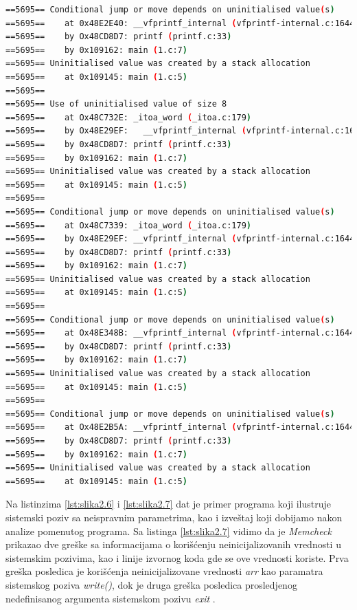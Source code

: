 \documentclass[12pt,oneside]{memoir}
\theoremstyle{plain}
\theoremstyle{definition}
\begin{document}

\begin{lstlisting}[style=terminal,caption={Primer ispisa greške korišćenja neinicializovane ili neadresirane vrednosti u sistemskom pozivu}, label={lst:slika2.7},language={bash}] 
==5695== Conditional jump or move depends on uninitialised value(s)
==5695==	at 0x48E2E40: __vfprintf_internal (vfprintf-internal.c:1644)
==5695==	by Ox48CD8D7: printf (printf.c:33)
==5695==	by 0x109162: main (1.c:7)
==5695== Uninitialised value was created by a stack allocation
==5695==	at 0x109145: main (1.c:5)
==5695==
==5695== Use of uninitialised value of size 8 
==5695==	at Ox48C732E: _itoa_word (_itoa.c:179)
==5695==	by Ox48E29EF:	__vfprintf_internal (vfprintf-internal.c:1644)
==5695==	by 0x48CD8D7: printf (printf.c:33)
==5695==	by 0x109162: main (1.c:7)
==5695== Uninitialised value was created by a stack allocation
==5695==	at 0x109145: main (1.c:5)
==5695==
==5695== Conditional jump or move depends on uninitialised value(s)
==5695==	at Ox48C7339: _itoa_word (_itoa.c:179)
==5695==	by Ox48E29EF: __vfprintf_internal (vfprintf-internal.c:1644)
==5695==	by Ox48CD8D7: printf (printf.c:33)
==5695==	by 0x109162: main (1.c:7)
==5695== Uninitialised value was created by a stack allocation
==5695==	at 0x109145: main (1.c:S)
==5695==
==5695== Conditional jump or move depends on uninitialised value(s)
==5695==	at Ox48E348B: __vfprintf_internal (vfprintf-internal.c:1644)
==5695==	by Ox48CD8D7: printf (printf.c:33)
==5695==	by 0x109162: main (1.c:7)
==5695== Uninitialised value was created by a stack allocation
==5695==	at 0x109145: main (1.c:5)
==5695==
==5695== Conditional jump or move depends on uninitialised value(s)
==5695==	at Ox48E2B5A: __vfprintf_internal (vfprintf-internal.c:1644)
==5695==	by Ox48CD8D7: printf (printf.c:33)
==5695==	by 0x109162: main (1.c:7)
==5695== Uninitialised value was created by a stack allocation
==5695==	at 0x109145: main (1.c:5)
\end{lstlisting}

Na listinzima \ref{lst:slika2.6} i \ref{lst:slika2.7} dat je primer programa koji ilustruje sistemski poziv sa neispravnim parametrima, kao i izveštaj koji dobijamo nakon analize pomenutog programa. Sa listinga \ref{lst:slika2.7} vidimo da je \textit{Memcheck} prikazao dve greške sa informacijama o korišćenju neinicijalizovanih vrednosti u sistemskim pozivima, kao i linije izvornog koda gde se ove vrednosti koriste. Prva greška posledica je korišćenja neinicijalizovane vrednosti \textit{arr} kao paramatra sistemskog poziva \textit{write()}, dok je druga greška posledica prosledjenog nedefinisanog argumenta sistemskom pozivu \textit{exit} \cite{Memcheck}. 
\end{document}
